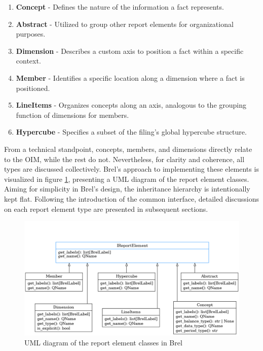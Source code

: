 \begin{enumerate}
\item \textbf{Concept} - Defines the nature of the information a fact represents.
\item \textbf{Abstract} - Utilized to group other report elements for organizational purposes.
\item \textbf{Dimension} - Describes a custom axis to position a fact within a specific context.
\item \textbf{Member} - Identifies a specific location along a dimension where a fact is positioned.
\item \textbf{LineItems} - Organizes concepts along an axis, analogous to the grouping function of dimensions for members.
\item \textbf{Hypercube} - Specifies a subset of the filing's global hypercube structure.
\end{enumerate}

From a technical standpoint, concepts, members, and dimensions directly relate to the OIM, while the rest do not.
Nevertheless, for clarity and coherence, all types are discussed collectively.
Brel's approach to implementing these elements is visualized in figure \ref{fig:brel_report_element_classes}, presenting a UML diagram of the report element classes.
Aiming for simplicity in Brel's design, the inheritance hierarchy is intentionally kept flat.
Following the introduction of the common interface, detailed discussions on each report element type are presented in subsequent sections.

\begin{figure}[H]
    \centering
    \includegraphics[width=\textwidth]{images/brel_report_elements_classes.png}
    \caption{UML diagram of the report element classes in Brel}
    \label{fig:brel_report_element_classes}
\end{figure}

